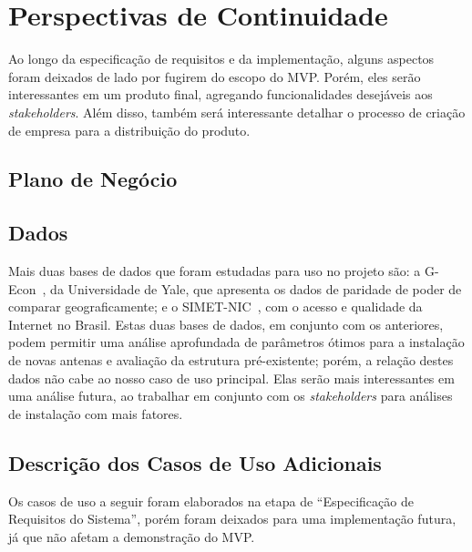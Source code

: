 \documentclass[]{politex}
\begin{document}

\section{Perspectivas de Continuidade}

Ao longo da especificação de requisitos e da implementação, alguns aspectos
foram deixados de lado por fugirem do escopo do MVP. Porém, eles serão
interessantes em um produto final, agregando funcionalidades desejáveis aos
\textit{stakeholders}. Além disso, também será interessante detalhar o processo de
criação de empresa para a distribuição do produto.

\subsection{Plano de Negócio}


\subsection{Dados}

Mais duas bases de dados que foram estudadas para uso no projeto são: a G-Econ~\cite{gecon},
da Universidade de Yale, que apresenta os dados de paridade de
poder de comparar geograficamente; e o SIMET-NIC~\cite{simet}, com o acesso e
qualidade da Internet no Brasil. Estas duas bases de dados, em conjunto com os
anteriores, podem permitir uma análise aprofundada de parâmetros ótimos para a
instalação de novas antenas e avaliação da estrutura pré-existente; porém,
a relação destes dados não cabe ao nosso caso de uso principal. Elas serão mais
interessantes em uma análise futura, ao trabalhar em conjunto com os
\textit{stakeholders} para análises de instalação com mais fatores.

\subsection{Descrição dos Casos de Uso Adicionais}

Os casos de uso a seguir foram elaborados na etapa de ``Especificação de
Requisitos do Sistema'', porém foram deixados para uma implementação futura, já
que não afetam a demonstração do MVP.
\end{document}
